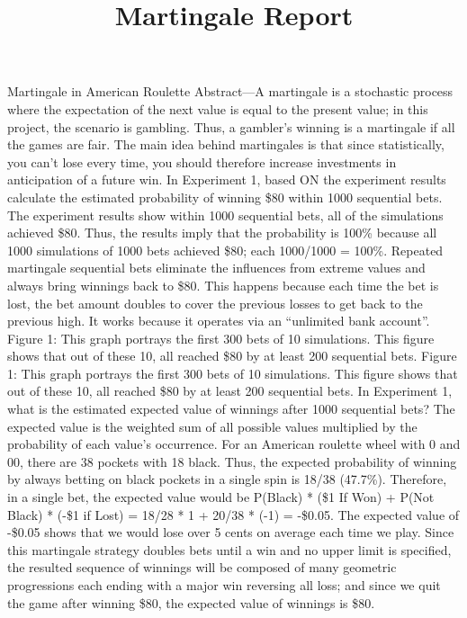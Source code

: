 \documentclass{article}
\begin{document}
\title{Martingale Report}
\author{}
\date{}
\maketitle

Martingale in American Roulette
Abstract—A martingale is a stochastic process where the expectation of the next value is equal to the present value; in this project, the scenario is gambling. Thus, a gambler’s winning is a martingale if all the games are fair. The main idea behind martingales is that since statistically, you can’t lose every time, you should therefore increase investments in anticipation of a future win.
In Experiment 1, based ON the experiment results calculate the estimated probability of winning \$80 within 1000 sequential bets.
The experiment results show within 1000 sequential bets, all of the simulations achieved \$80. Thus, the results imply that the probability is 100\% because all 1000 simulations of 1000 bets achieved \$80; each 1000/1000 = 100\%. Repeated martingale sequential bets eliminate the influences from extreme values and always bring winnings back to \$80. This happens because each time the bet is lost, the bet amount doubles to cover the previous losses to get back to the previous high. It works because it operates via an “unlimited bank account”.
Figure 1: This graph portrays the first 300 bets of 10 simulations. This figure shows that out of these 10, all reached \$80 by at least 200 sequential bets.
Figure 1: This graph portrays the first 300 bets of 10 simulations. This figure shows that out of these 10, all reached \$80 by at least 200 sequential bets.
In Experiment 1, what is the estimated expected value of winnings after 1000 sequential bets?
The expected value is the weighted sum of all possible values multiplied by the probability of each value’s occurrence.
For an American roulette wheel with 0 and 00, there are 38 pockets with 18 black. Thus, the expected probability of winning by always betting on black pockets in a single spin is 18/38 (47.7\%). Therefore, in a single bet, the expected value would be P(Black) * (\$1 If Won) + P(Not Black) * (-\$1 if Lost) = 18/28 * 1 + 20/38 * (-1) = -\$0.05. The expected value of -\$0.05 shows that we would lose over 5 cents on average each time we play.
Since this martingale strategy doubles bets until a win and no upper limit is specified, the resulted sequence of winnings will be composed of many geometric progressions each ending with a major win reversing all loss; and since we quit the game after winning \$80, the expected value of winnings is \$80. 
\end{document}
